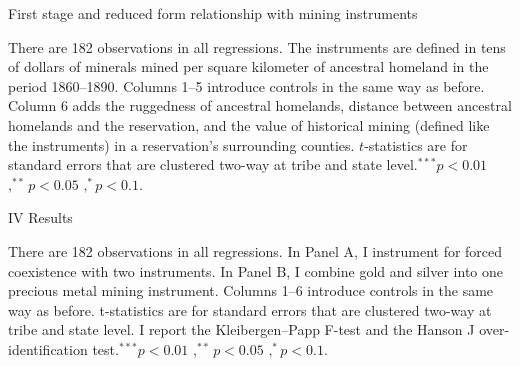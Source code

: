 \begin{rotatepage}
\begin{landscape}
\begin{table}[htb]
\caption{\sc First stage and reduced form relationship with mining instruments}
\label{tab:first_stage} \vspace{-10pt} 
  \vspace{-10pt} 
\footnotesize{ There are 182 observations in all regressions. The instruments are defined in tens of dollars of minerals mined per square kilometer of ancestral homeland in the period 1860–1890. Columns 1–5 introduce controls in the same way as before. Column 6 adds the ruggedness of ancestral homelands, distance between ancestral homelands and the reservation, and the value of historical mining (defined like the instruments) in a reservation’s surrounding counties. $t$-statistics are for standard errors that are clustered two-way at tribe and state level$.^{***}p<0.01$ $,^{**} p<0.05$ $,^* p<0.1$.} 
\end{table}
\end{landscape}
\end{rotatepage}

\begin{rotatepage}
\begin{landscape}
\begin{table}[htb]
\caption{\sc IV Results} 
\label{tab:iv} \vspace{-10pt}
 \vspace{-10pt}
\footnotesize{There are 182 observations in all regressions. In Panel A, I instrument for forced coexistence with two instruments. In Panel B, I combine gold and silver into one precious metal mining instrument. Columns 1–6 introduce controls in the same way as before. t-statistics are for standard errors that are clustered two-way at tribe and state level. I report the Kleibergen–Papp F-test and the Hanson J over-identification test.$^{***}p<0.01$ $,^{**} p<0.05$ $,^* p<0.1$.} 
\end{table}
\end{landscape}
\end{rotatepage}


\pagebreak 
